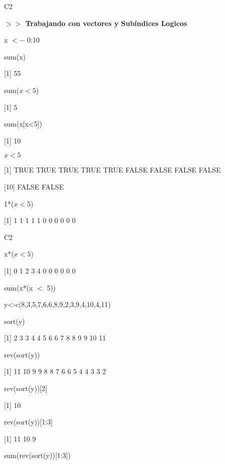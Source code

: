 \documentclass{beamer}
\theoremstyle{definition}
\theoremstyle{remark}
\begin{document}
\begin{frame}{C2}

\textbf{$>>$ Trabajando con vectores y Sub\'indices Logicos}



\hfill

x $<-$ 0:10

sum(x)

[1] 55

\hfill

sum($x<5$)

[1] 5

\hfill

sum(x[x<5])

[1] 10

\hfill

$x<5$

[1] TRUE TRUE TRUE TRUE TRUE FALSE FALSE FALSE FALSE

[10] FALSE FALSE

\hfill

1*($x<5$)

[1] 1 1 1 1 1 0 0 0 0 0 0

\hfill




\end{frame}


\begin{frame}{C2}

x*($x<5$)

[1] 0 1 2 3 4 0 0 0 0 0 0

\hfill

sum(x*(x $<$ 5))

\hfill

y<-c(8,3,5,7,6,6,8,9,2,3,9,4,10,4,11)

\hfill

sort(y)

[1] 2 3 3 4 4 5 6 6 7 8 8 9 9 10 11

\hfill

rev(sort(y))

[1] 11 10 9 9 8 8 7 6 6 5 4 4 3 3 2

\hfill

rev(sort(y))[2]

[1] 10

\hfill

rev(sort(y))[1:3]

[1] 11 10 9

\hfill

sum(rev(sort(y))[1:3])


\end{frame}
\end{document}

